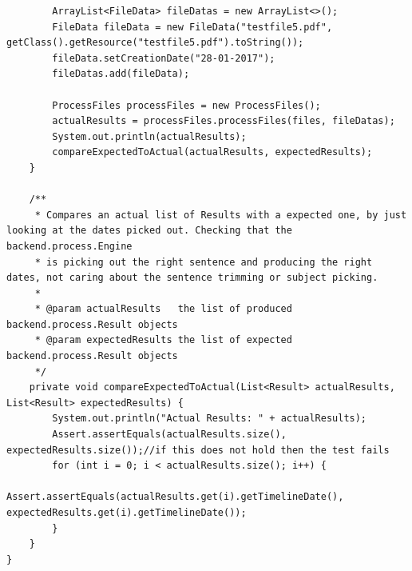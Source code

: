 \begin{lstlisting}
        ArrayList<FileData> fileDatas = new ArrayList<>();
        FileData fileData = new FileData("testfile5.pdf", getClass().getResource("testfile5.pdf").toString());
        fileData.setCreationDate("28-01-2017");
        fileDatas.add(fileData);

        ProcessFiles processFiles = new ProcessFiles();
        actualResults = processFiles.processFiles(files, fileDatas);
        System.out.println(actualResults);
        compareExpectedToActual(actualResults, expectedResults);
    }

    /**
     * Compares an actual list of Results with a expected one, by just looking at the dates picked out. Checking that the backend.process.Engine
     * is picking out the right sentence and producing the right dates, not caring about the sentence trimming or subject picking.
     *
     * @param actualResults   the list of produced backend.process.Result objects
     * @param expectedResults the list of expected backend.process.Result objects
     */
    private void compareExpectedToActual(List<Result> actualResults, List<Result> expectedResults) {
        System.out.println("Actual Results: " + actualResults);
        Assert.assertEquals(actualResults.size(), expectedResults.size());//if this does not hold then the test fails
        for (int i = 0; i < actualResults.size(); i++) {
            Assert.assertEquals(actualResults.get(i).getTimelineDate(), expectedResults.get(i).getTimelineDate());
        }
    }
}
\end{lstlisting}
